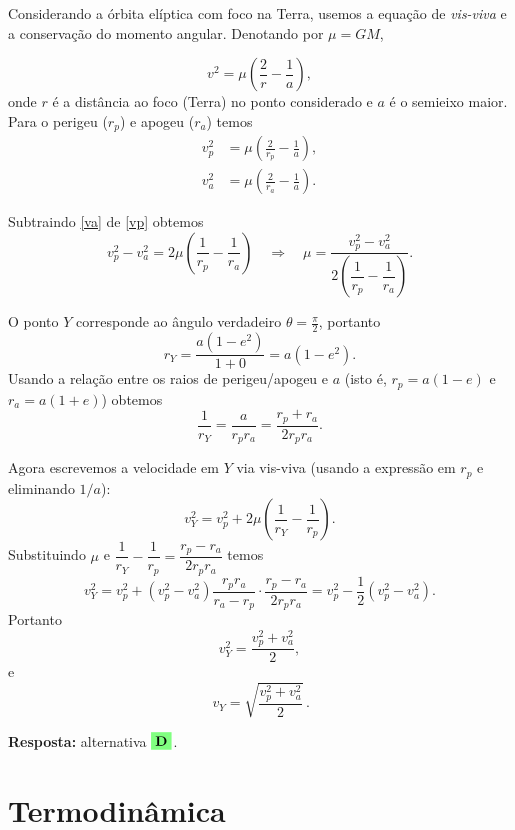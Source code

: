\documentclass[a4paper,12pt]{article}
\begin{document}
\begin{flushleft}
Considerando a órbita elíptica com foco na Terra, usemos a equação de \emph{vis-viva} e a conservação do momento angular. Denotando por $\mu=GM$,

\[
v^2=\mu\!\left(\frac{2}{r}-\frac{1}{a}\right),
\]
onde $r$ é a distância ao foco (Terra) no ponto considerado e $a$ é o semieixo maior. Para o perigeu ($r_p$) e apogeu ($r_a$) temos
\begin{align}
v_p^2&=\mu\!\left(\frac{2}{r_p}-\frac{1}{a}\right),\label{vp}\\
v_a^2&=\mu\!\left(\frac{2}{r_a}-\frac{1}{a}\right).\label{va}
\end{align}

Subtraindo \eqref{va} de \eqref{vp} obtemos
\[
v_p^2-v_a^2=2\mu\!\left(\frac{1}{r_p}-\frac{1}{r_a}\right)
\quad\Rightarrow\quad
\mu=\frac{v_p^2-v_a^2}{2\left(\dfrac{1}{r_p}-\dfrac{1}{r_a}\right)}.
\]

O ponto $Y$ corresponde ao ângulo verdadeiro $\theta=\tfrac{\pi}{2}$, portanto
\[
r_Y=\frac{a(1-e^2)}{1+0}=a(1-e^2).
\]
Usando a relação entre os raios de perigeu/apogeu e $a$ (isto é, $r_p=a(1-e)$ e $r_a=a(1+e)$) obtemos
\[
\frac{1}{r_Y}=\frac{a}{r_pr_a}=\frac{r_p+r_a}{2r_pr_a}.
\]

Agora escrevemos a velocidade em $Y$ via vis-viva (usando a expressão em $r_p$ e eliminando $1/a$):
\[
v_Y^2=v_p^2+2\mu\!\left(\frac{1}{r_Y}-\frac{1}{r_p}\right).
\]
Substituindo $\mu$ e $\dfrac{1}{r_Y}-\dfrac{1}{r_p}=\dfrac{r_p-r_a}{2r_pr_a}$ temos
\[
v_Y^2
= v_p^2 + (v_p^2-v_a^2)\frac{r_pr_a}{r_a-r_p}\cdot\frac{r_p-r_a}{2r_pr_a}
= v_p^2 -\frac{1}{2}(v_p^2-v_a^2).
\]
Portanto
\[
v_Y^2=\frac{v_p^2+v_a^2}{2},
\]
e
\[
\boxed{\,v_Y=\sqrt{\dfrac{v_p^2+v_a^2}{2}}\,.}
\]

\textbf{Resposta:} alternativa \(\colorbox{green!50}{\textbf{D}}\).

\end{flushleft}


\section{Termodin\^amica}
\end{document}
